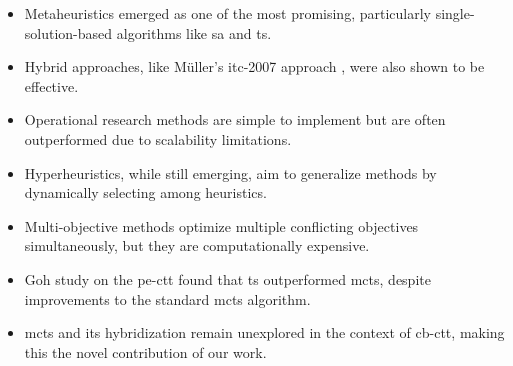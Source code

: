 \begin{itemize}
\item Metaheuristics emerged as one of the most promising, particularly single-solution-based algorithms like \ac{sa} and \ac{ts}.
\item Hybrid approaches, like Müller’s \ac{itc-2007} approach \cite{muller_itc2007}, were also shown to be effective.
\item Operational research methods are simple to implement but are often outperformed due to scalability limitations.
\item Hyperheuristics, while still emerging, aim to generalize methods by dynamically selecting among heuristics.
\item Multi-objective methods optimize multiple conflicting objectives simultaneously, but they are computationally expensive.
\item Goh \cite{goh_MCTS} study on the \ac{pe-ctt} found that \ac{ts} outperformed \ac{mcts}, despite improvements to the standard \ac{mcts} algorithm.
\item \ac{mcts} and its hybridization remain unexplored in the context of \ac{cb-ctt}, making this the novel contribution of our work.
\end{itemize}






















